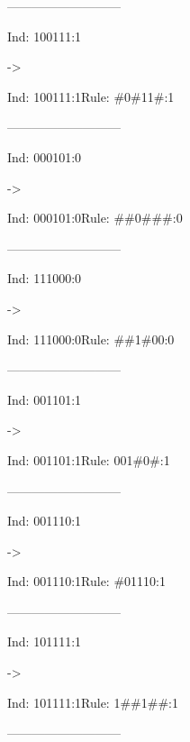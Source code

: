 \documentclass[12pt,openright,twoside,letterpaper,english,brazil,sumario=tradicional]{abntex2}
\begin{document}
---------------------------

\begin{flushleft}\ttfamily
\par Ind: 100111:1\end{flushleft} -> \begin{flushleft}\ttfamily
\par Ind: 100111:1Rule: \textcolor[cmy]{0.0067389,0.464581,0.351225,}{\#0\#11\#:1}
\end{flushleft}---------------------------

\begin{flushleft}\ttfamily
\par Ind: 000101:0\end{flushleft} -> \begin{flushleft}\ttfamily
\par Ind: 000101:0Rule: \textcolor[cmy]{0.473342,0.137244,0.179844,}{\#\#0\#\#\#:0}
\end{flushleft}---------------------------

\begin{flushleft}\ttfamily
\par Ind: 111000:0\end{flushleft} -> \begin{flushleft}\ttfamily
\par Ind: 111000:0Rule: \textcolor[cmy]{0.899923,0.324427,0.200657,}{\#\#1\#00:0}
\end{flushleft}---------------------------

\begin{flushleft}\ttfamily
\par Ind: 001101:1\end{flushleft} -> \begin{flushleft}\ttfamily
\par Ind: 001101:1Rule: \textcolor[cmy]{0.838505,0.452994,0.786672,}{001\#0\#:1}
\end{flushleft}---------------------------

\begin{flushleft}\ttfamily
\par Ind: 001110:1\end{flushleft} -> \begin{flushleft}\ttfamily
\par Ind: 001110:1Rule: \textcolor[cmy]{0.416749,0.233193,0.0518743,}{\#01110:1}
\end{flushleft}---------------------------

\begin{flushleft}\ttfamily
\par Ind: 101111:1\end{flushleft} -> \begin{flushleft}\ttfamily
\par Ind: 101111:1Rule: \textcolor[cmy]{0.741688,0.163733,0.939221,}{1\#\#1\#\#:1}
\end{flushleft}---------------------------
\end{document}
